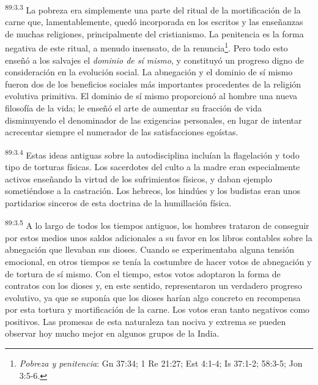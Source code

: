 \documentclass[twoside, 11pt]{book}
\begin{document}
\par
\textsuperscript{89:3.3} La pobreza era simplemente una parte del ritual de la mortificación de la carne que, lamentablemente, quedó incorporada en los escritos y las enseñanzas de muchas religiones, principalmente del cristianismo. La penitencia es la forma negativa de este ritual, a menudo insensato, de la renuncia\footnote{\textit{Pobreza y penitencia}: Gn 37:34; 1 Re 21:27; Est 4:1-4; Is 37:1-2; 58:3-5; Jon 3:5-6.}. Pero todo esto enseñó a los salvajes el \textit{dominio de sí mismo}, y constituyó un progreso digno de consideración en la evolución social. La abnegación y el dominio de sí mismo fueron dos de los beneficios sociales más importantes procedentes de la religión evolutiva primitiva. El dominio de sí mismo proporcionó al hombre una nueva filosofía de la vida; le enseñó el arte de aumentar su fracción de vida disminuyendo el denominador de las exigencias personales, en lugar de intentar acrecentar siempre el numerador de las satisfacciones egoístas.

\par
\textsuperscript{89:3.4} Estas ideas antiguas sobre la autodisciplina incluían la flagelación y todo tipo de torturas físicas. Los sacerdotes del culto a la madre eran especialmente activos enseñando la virtud de los sufrimientos físicos, y daban ejemplo sometiéndose a la castración. Los hebreos, los hindúes y los budistas eran unos partidarios sinceros de esta doctrina de la humillación física.

\par
\textsuperscript{89:3.5} A lo largo de todos los tiempos antiguos, los hombres trataron de conseguir por estos medios unos saldos adicionales a su favor en los libros contables sobre la abnegación que llevaban sus dioses. Cuando se experimentaba alguna tensión emocional, en otros tiempos se tenía la costumbre de hacer votos de abnegación y de tortura de sí mismo. Con el tiempo, estos votos adoptaron la forma de contratos con los dioses y, en este sentido, representaron un verdadero progreso evolutivo, ya que se suponía que los dioses harían algo concreto en recompensa por esta tortura y mortificación de la carne. Los votos eran tanto negativos como positivos. Las promesas de esta naturaleza tan nociva y extrema se pueden observar hoy mucho mejor en algunos grupos de la India.
\end{document}
